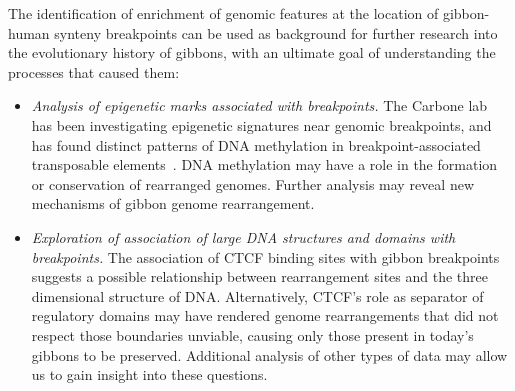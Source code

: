 The identification of enrichment of genomic features at the location of gibbon-human synteny breakpoints can be used as background for further research into the evolutionary history of gibbons, with an ultimate goal of understanding the processes that caused them:

\begin{itemize}
\item \emph{Analysis of epigenetic marks associated with breakpoints.} The Carbone lab has been investigating epigenetic signatures near genomic breakpoints, and has found distinct patterns of DNA methylation in breakpoint-associated transposable elements~\cite{Lazar:2014}. DNA methylation may have a role in the formation or conservation of rearranged genomes. Further analysis may reveal new mechanisms of gibbon genome rearrangement.
\item \emph{Exploration of association of large DNA structures and domains with breakpoints.} The association of CTCF binding sites with gibbon breakpoints suggests a possible relationship between rearrangement sites and the three dimensional structure of DNA. Alternatively, CTCF's role as separator of regulatory domains may have rendered genome rearrangements that did not respect those boundaries unviable, causing only those present in today's gibbons to be preserved. Additional analysis of other types of data may allow us to gain insight into these questions.
\end{itemize}